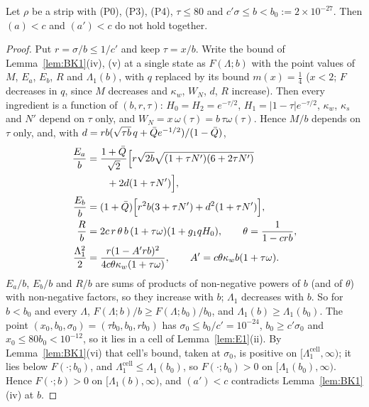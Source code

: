 \begin{lemma} \proofst
\label{lem:E2}
Let $\rho$ be a strip with (P0), (P3), (P4), $\tau\le80$ and $c'\sigma\le b<b_0:=2\times10^{-27}$. Then $(a)<c$ and $(a')<c$ do not hold together.
\end{lemma}
\begin{proof}
Put $r=\sigma/b\le1/c'$ and keep $\tau=x/b$. Write the bound of Lemma~\ref{lem:BK1}(iv), (v) at a single state as $F(\Lambda;b)$ with the
point values of $M$, $E_a$, $E_b$, $R$ and $\Lambda_1(b)$, with $q$ replaced by its bound $m(x)=\frac14$ ($x<2$; $F$ decreases in $q$, since $M$
decreases and $\kappa_w$, $W_N$, $d$, $R$ increase). Then every ingredient is a function of $(b,r,\tau)$:
$H_0=H_2=e^{-\tau/2}$, $H_1=|1-\tau|e^{-\tau/2}$, $\kappa_w$, $\kappa_s$ and $N'$ depend on $\tau$ only, and $W_N=x\,\omega(\tau)=b\,\tau\omega(\tau)$. Hence
$M/b$ depends on $\tau$ only, and, with $d=rb(\sqrt{\tau b}\,q+\bar Q e^{-1/2})/(1-\bar Q)$,
\begin{equation*}
\begin{aligned}
\frac{E_a}b&=\frac{1+\bar Q}{\sqrt2}\Big[r\sqrt{2b}\sqrt{(1+\tau N')(6+2\tau N')}\\&\qquad+2d(1+\tau N')\Big],\\
\frac{E_b}b&=(1+\bar Q)\Big[r^2b(3+\tau N')+d^2(1+\tau N')\Big],\\
\frac Rb&=2c\,r\,\theta\,b\,(1+\tau\omega)(1+g_1qH_0),\qquad \theta=\frac1{1-crb},\\
\frac{\Lambda_1^2}2&=\frac{r(1-A'rb)^2}{4c\theta\kappa_w(1+\tau\omega)},\qquad A'=c\theta\kappa_wb(1+\tau\omega).
\end{aligned}
\end{equation*}
$E_a/b$, $E_b/b$ and $R/b$ are sums of products of non-negative powers of $b$ (and of $\theta$) with non-negative factors, so they increase with $b$; $\Lambda_1$
decreases with $b$. So for $b<b_0$ and every $\Lambda$, $F(\Lambda;b)/b\ge F(\Lambda;b_0)/b_0$, and $\Lambda_1(b)\ge\Lambda_1(b_0)$. The point
$(x_0,b_0,\sigma_0)=(\tau b_0,b_0,rb_0)$ has $\sigma_0\le b_0/c'=10^{-24}$, $b_0\ge c'\sigma_0$ and $x_0\le80b_0<10^{-12}$, so it lies in a cell of
Lemma~\ref{lem:E1}(ii). By Lemma~\ref{lem:BK1}(vi) that cell's bound, taken at $\sigma_0$, is positive on $[\Lambda_1^{\mathrm{cell}},\infty)$; it lies below
$F(\cdot;b_0)$, and $\Lambda_1^{\mathrm{cell}}\le\Lambda_1(b_0)$, so $F(\cdot;b_0)>0$ on $[\Lambda_1(b_0),\infty)$. Hence $F(\cdot;b)>0$ on $[\Lambda_1(b),\infty)$, and $(a')<c$ contradicts Lemma~\ref{lem:BK1}(iv) at $b$.
\end{proof}

